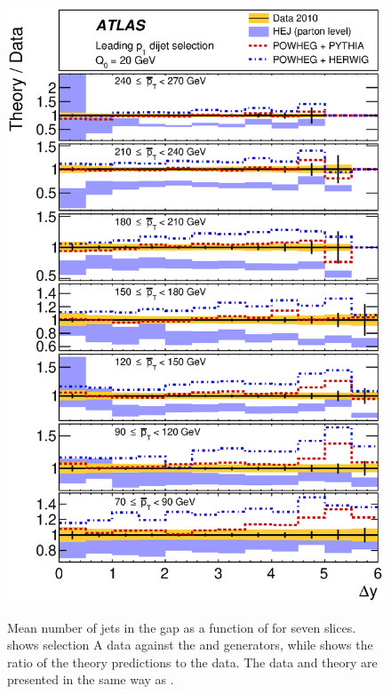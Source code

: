 \begin{figure}[htpb]
{    \includegraphics[width=\smallfigwidth]{chapters/gbj/Njet_YDist_gap_Q0_sel_A_Ratio.eps}
    \label{fig:gbj:N_jets_dY_A_ratio}}
  \caption{Mean number of jets in the gap as a function of \DeltaY for seven \pTbar
           slices. \protect{} shows selection
           A data against the \HEJ and \Powheg generators, while \protect{}
           shows the ratio of the theory predictions to the data. The data and theory
           are presented in the same way as .}
  \label{fig:gbj:N_jets_dY_A}
\end{figure}

